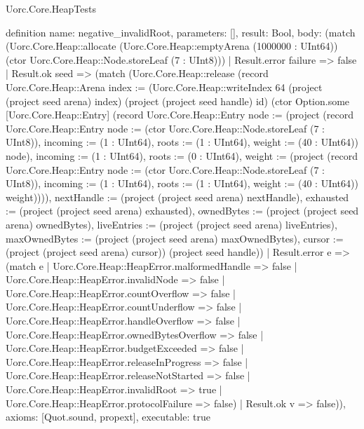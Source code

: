 \begin{lexlean}{Uorc.Core.HeapTests}
\begin{semanticmodule}
definition{
  name: negative_invalidRoot,
  parameters: [],
  result: Bool,
  body: (match (Uorc.Core.Heap::allocate (Uorc.Core.Heap::emptyArena (1000000 : UInt64)) (ctor Uorc.Core.Heap::Node.storeLeaf (7 : UInt8)))
    | Result.error failure => false
    | Result.ok seed => (match (Uorc.Core.Heap::release (record Uorc.Core.Heap::Arena {index := (Uorc.Core.Heap::writeIndex 64 (project (project seed arena) index) (project (project seed handle) id) (ctor Option.some [Uorc.Core.Heap::Entry] (record Uorc.Core.Heap::Entry {node := (project (record Uorc.Core.Heap::Entry {node := (ctor Uorc.Core.Heap::Node.storeLeaf (7 : UInt8)), incoming := (1 : UInt64), roots := (1 : UInt64), weight := (40 : UInt64)}) node), incoming := (1 : UInt64), roots := (0 : UInt64), weight := (project (record Uorc.Core.Heap::Entry {node := (ctor Uorc.Core.Heap::Node.storeLeaf (7 : UInt8)), incoming := (1 : UInt64), roots := (1 : UInt64), weight := (40 : UInt64)}) weight)}))), nextHandle := (project (project seed arena) nextHandle), exhausted := (project (project seed arena) exhausted), ownedBytes := (project (project seed arena) ownedBytes), liveEntries := (project (project seed arena) liveEntries), maxOwnedBytes := (project (project seed arena) maxOwnedBytes), cursor := (project (project seed arena) cursor)}) (project seed handle))
      | Result.error e => (match e
        | Uorc.Core.Heap::HeapError.malformedHandle => false
        | Uorc.Core.Heap::HeapError.invalidNode => false
        | Uorc.Core.Heap::HeapError.countOverflow => false
        | Uorc.Core.Heap::HeapError.countUnderflow => false
        | Uorc.Core.Heap::HeapError.handleOverflow => false
        | Uorc.Core.Heap::HeapError.ownedBytesOverflow => false
        | Uorc.Core.Heap::HeapError.budgetExceeded => false
        | Uorc.Core.Heap::HeapError.releaseInProgress => false
        | Uorc.Core.Heap::HeapError.releaseNotStarted => false
        | Uorc.Core.Heap::HeapError.invalidRoot => true
        | Uorc.Core.Heap::HeapError.protocolFailure => false)
      | Result.ok v => false)),
  axioms: [Quot.sound, propext],
  executable: true
}


\end{semanticmodule}
\end{lexlean}
